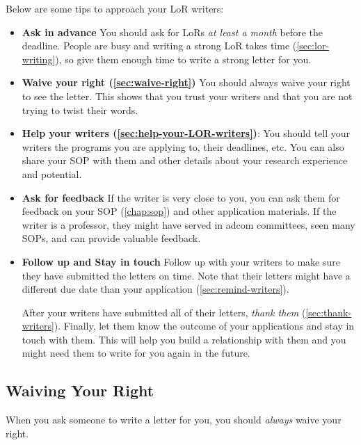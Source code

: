 \documentclass[oneside,11pt,dvipsnames]{book}
\begin{document}
Below are some tips to approach your LoR writers:
\begin{itemize}
\item \textbf{Ask in advance} You should ask for LoRs \emph{at least a month} before the deadline. People are busy and writing a strong LoR takes time (\autoref{sec:lor-writing}), so give them enough time to write a strong letter for you.

\item \textbf{Waive your right (\autoref{sec:waive-right})} You should always waive your right to see the letter. This shows that you trust your writers and that you are not trying to twist their words.

\item \textbf{Help your writers (\autoref{sec:help-your-LOR-writers})}: You should tell your writers the programs you are applying to, their deadlines, etc.  You can also share your SOP with them and other details about your research experience and potential. 




\item \textbf{Ask for feedback} If the writer is very close to you, you can ask them for feedback on your SOP (\autoref{chap:sop}) and other application materials. If the writer is a professor, they might have served in adcom committees, seen many SOPs, and can provide valuable feedback.

\item \textbf{Follow up and Stay in touch} Follow up with your writers to make sure they have submitted the letters on time. Note that their letters might have a different due date than your application (\autoref{sec:remind-writers}). 

After your writers have submitted all of their letters, \emph{thank them} (\autoref{sec:thank-writers}).  Finally, let them know the outcome of your applications and stay in touch with them.  This will help you build a relationship with them and you might need them to write for you again in the future.
\end{itemize}



\subsection{Waiving Your Right}\label{sec:waive-right}

When you ask someone to write a letter for you, you should \emph{always} waive your right.
\end{document}
